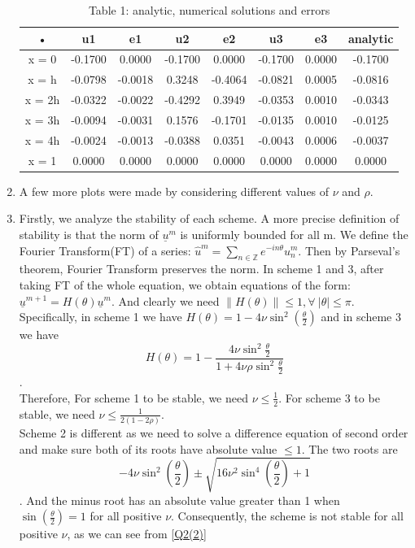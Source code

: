 \documentclass[a4paper,11pt]{article}
\begin{document}
\begin{enumerate}[label = (\roman*)]
\begin{table}[H]
\begin{tabular}{|c|c|c|c|c|c|c|c|}
\hline 
• & u1 & e1 & u2 & e2 & u3 & e3 & analytic \\ 
\hline 
x = 0 & -0.1700 & 0.0000 & -0.1700 & 0.0000 & -0.1700 & 0.0000 & -0.1700 \\ 
\hline 
x = h & -0.0798 & -0.0018 & 0.3248 & -0.4064 & -0.0821 & 0.0005 & -0.0816 \\ 
\hline 
x = 2h & -0.0322 & -0.0022 & -0.4292 & 0.3949 & -0.0353 & 0.0010 & -0.0343 \\ 
\hline 
x = 3h & -0.0094 & -0.0031 & 0.1576 & -0.1701 & -0.0135 & 0.0010 & -0.0125 \\ 
\hline 
 x = 4h & -0.0024 & -0.0013 & -0.0388 & 0.0351 & -0.0043& 0.0006 & -0.0037 \\ 
\hline 
x = 1 & 0.0000 & 0.0000 & 0.0000 & 0.0000 & 0.0000 & 0.0000 & 0.0000 \\ 
\hline 
\end{tabular} 
\caption{Table 1: analytic, numerical solutions and errors}
\label{T1}
\end{table}
\item
A few more plots were made by considering different values of $\nu$ and $\rho$. 
\item
Firstly, we analyze the stability of each scheme. A more precise definition of stability is that the norm of 
$\underline{u}^m$ is uniformly bounded for all m. We define the Fourier Transform(FT) of a series: $\hat{u}^m = \sum_{n\in \mathbb{Z}} e^{-in\theta} u_{n}^{m}$. Then by Parseval's theorem, Fourier Transform preserves the norm. 
In scheme 1 and 3, after taking FT of the whole equation, we obtain equations of the form: $\underline{u}^{m+1} = H(\theta)\underline{u}^{m}$. And clearly we need $\|H(\theta)\| \leqslant 1, \forall\ |\theta| \leqslant \pi$.\\
Specifically, in scheme 1 we have $H(\theta) = 1-4\nu\sin^2(\frac{\theta}{2})$ and in scheme 3 we have $$H(\theta) = 1-\frac{4\nu\sin^2{\frac{\theta}{2}}}{1+4\nu\rho\sin^2{\frac{\theta}{2}}}$$.\\
Therefore, 
For scheme 1 to be stable, we need $\nu \leqslant \frac{1}{2}$.
For scheme 3 to be stable, we need $\nu \leqslant \frac{1}{2(1-2\rho)}$.\\
Scheme 2 is different as we need to solve a difference equation of second order and make sure both of its roots have absolute value $\leqslant 1$. The two roots are $$-4\nu\sin^2(\frac{\theta}{2})\pm \sqrt{16\nu^2\sin^4(\frac{\theta}{2})+1}$$. And the minus root has an absolute value greater than 1 when $\sin(\frac{\theta}{2}) = 1$ for all positive $\nu$. Consequently, the scheme is not stable for all positive $\nu$, as we can see from \ref{Q2(2)}\\


\end{enumerate}
\end{document}
